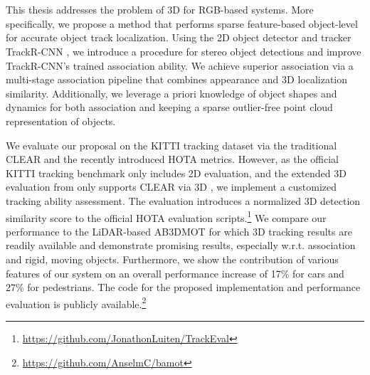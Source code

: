 \chapter{\abstractname}
This thesis addresses the problem of 3D  for RGB-based systems.
More specifically, we propose a method that performs sparse feature-based object-level  for accurate object track localization.
Using the 2D object detector and tracker TrackR-CNN \cite{voigtlaenderMOTSMultiObjectTracking2019}, we introduce a procedure for stereo object detections and improve TrackR-CNN's trained association ability.
We achieve superior association via a multi-stage association pipeline that combines appearance and 3D localization similarity.
Additionally, we leverage a priori knowledge of object shapes and dynamics for both association and keeping a sparse outlier-free point cloud representation of objects.

We evaluate our proposal on the KITTI \cite{geigerVisionMeetsRobotics2013} tracking dataset via the traditional CLEAR \cite{bernardinEvaluatingMultipleObject2008} and the recently introduced HOTA \cite{luitenHOTAHigherOrder2021} metrics.
However, as the official KITTI tracking benchmark only includes 2D  evaluation, and the extended 3D evaluation from \cite{wengBaseline3DMultiObject2019} only supports CLEAR via 3D , we implement a customized
tracking ability assessment.
The evaluation introduces a normalized 3D  \cite{rezatofighiGeneralizedIntersectionUnion2019} detection similarity score to the official HOTA evaluation scripts.\footnote{\url{https://github.com/JonathonLuiten/TrackEval}}
We compare our performance to the LiDAR-based AB3DMOT \cite{wengBaseline3DMultiObject2019} for which 3D tracking results are readily available and demonstrate promising results, especially w.r.t. association and rigid, moving objects.
Furthermore, we show the contribution of various features of our system on an overall performance increase of 17\% for cars and 27\% for pedestrians.
The code for the proposed implementation and performance evaluation is publicly available.\footnote{\url{https://github.com/AnselmC/bamot}}
